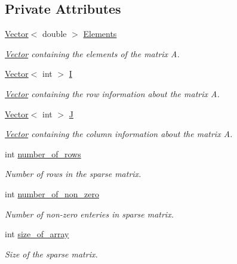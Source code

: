 \subsection*{Private Attributes}
\begin{DoxyCompactItemize}
\item 
\hyperlink{class_vector}{Vector}$<$ double $>$ \hyperlink{class_sparse_matrix_a3ed1cb2b0a0dd4b6c7220c49d6535efb}{Elements}
\begin{DoxyCompactList}\small\item\em \hyperlink{class_vector}{Vector} containing the elements of the matrix A. \end{DoxyCompactList}\item 
\hyperlink{class_vector}{Vector}$<$ int $>$ \hyperlink{class_sparse_matrix_ab44942445ac457aaa6e984615fcf7b49}{I}
\begin{DoxyCompactList}\small\item\em \hyperlink{class_vector}{Vector} containing the row information about the matrix A. \end{DoxyCompactList}\item 
\hyperlink{class_vector}{Vector}$<$ int $>$ \hyperlink{class_sparse_matrix_a9febac8d56047bfcb48c6849f9b8ebcd}{J}
\begin{DoxyCompactList}\small\item\em \hyperlink{class_vector}{Vector} containing the column information about the matrix A. \end{DoxyCompactList}\item 
int \hyperlink{class_sparse_matrix_a5f84c3e572c129bbef55d4e9343abd1b}{number\+\_\+of\+\_\+rows}
\begin{DoxyCompactList}\small\item\em Number of rows in the sparse matrix. \end{DoxyCompactList}\item 
int \hyperlink{class_sparse_matrix_aad150f4ad676a2919a478457e7c050d3}{number\+\_\+of\+\_\+non\+\_\+zero}
\begin{DoxyCompactList}\small\item\em Number of non-\/zero enteries in sparse matrix. \end{DoxyCompactList}\item 
int \hyperlink{class_sparse_matrix_ab741b7b30296448a3f004d8a5c24fc33}{size\+\_\+of\+\_\+array}
\begin{DoxyCompactList}\small\item\em Size of the sparse matrix. \end{DoxyCompactList}\end{DoxyCompactItemize}


